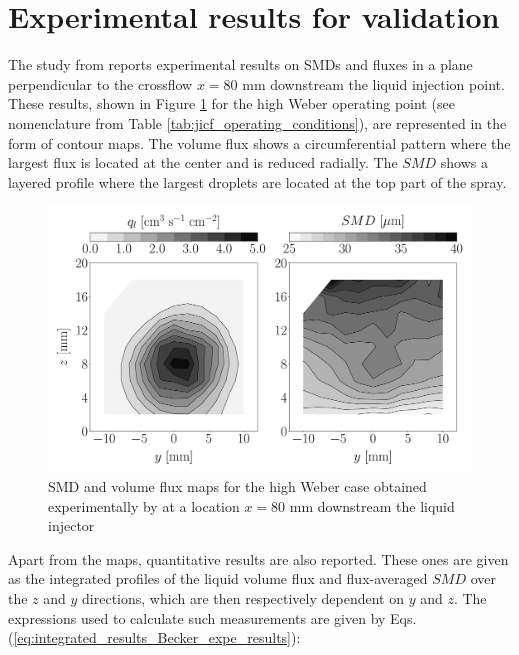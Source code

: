 \section{Experimental results for validation}
\label{sec:ch6_experimental_results}

The study from  reports experimental results on SMDs and fluxes in a plane perpendicular to the crossflow $x = 80$ mm downstream the liquid injection point. These results, shown in Figure \ref{fig:maps_Becker_expe_results} for the high Weber operating point (see nomenclature from Table \ref{tab:jicf_operating_conditions}), are represented in the form of contour maps.  The volume flux shows a circumferential pattern where the largest flux is located at the center and is reduced radially. The $SMD$ shows a layered profile where the largest droplets are located at the top part of the spray.

\begin{figure}[h!]
\centering
   \includegraphics[scale=0.19]{./part2_developments/figures_ch6_lagrangian_JICF/expe_results/maps_UG100}
\caption{SMD and volume flux maps for the high Weber case obtained experimentally by  at a location $x = 80$ mm downstream the liquid injector}
\label{fig:maps_Becker_expe_results}
\end{figure}

Apart from the maps, quantitative results are also reported. These ones are given as the integrated profiles of the liquid volume flux and flux-averaged $SMD$ over the $z$ and $y$ directions, which are then respectively dependent on $y$ and $z$. The expressions used to calculate such measurements are given by Eqs. (\ref{eq:integrated_results_Becker_expe_results}):


